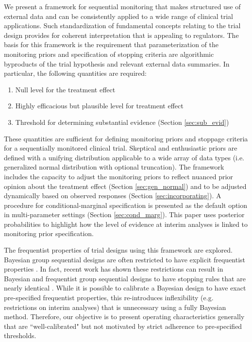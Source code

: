 \documentclass[useAMS,usenatbib,referee]{biom}
\begin{document}
We present a framework for sequential monitoring that makes structured use of external data and can be consistently applied to a wide range of clinical trial applications. Such standardization of fundamental concepts relating to the trial design provides for coherent interpretation that is appealing to regulators. The basis for this framework is the requirement that parameterization of the monitoring priors and specification of stopping criteria are algorithmic byproducts of the trial hypothesis and relevant external data summaries. In particular, the following quantities are required:

\begin{enumerate}
\item Null level for the treatment effect
\item Highly efficacious but plausible level for treatment effect
\item Threshold for determining substantial evidence (Section \ref{sec:sub_evid})
\end{enumerate}

These quantities are sufficient for defining monitoring priors and stoppage criteria for a sequentially monitored clinical trial. Skeptical and enthusiastic priors are defined with a unifying distribution applicable to a wide array of data types (i.e. generalized normal distribution with optional truncation). The framework includes the capacity to adjust the monitoring priors to reflect nuanced prior opinion about the treatment effect (Section \ref{sec:gen_normal}) and to be adjusted dynamically based on observed responses (Section \ref{sec:incorporating}). A procedure for conditional-marginal specification is presented as the default option in multi-parameter settings (Section \ref{sec:cond_marg}). This paper uses posterior probabilities to highlight how the level of evidence at interim analyses is linked to monitoring prior specification. 

The frequentist properties of trial designs using this framework are explored. Bayesian group sequential designs are often restricted to have explicit frequentist properties \citep{Ventz2015, Zhu2015}. In fact, recent work has shown these restrictions can result in Bayesian and frequentist group sequential designs to have stopping rules that are nearly identical \citep{Stallard2020, Kopp-Schneider2019, Zhu2019}.
While it is possible to calibrate a Bayesian design to have exact pre-specified frequentist properties, this re-introduces inflexibility (e.g. restrictions on interim analyses) that is unnecessary using a fully Bayesian method. Therefore, our objective is to present operating characteristics generally that are ``well-calibrated" \citep{Grieve2016} but not motivated by strict adherence to pre-specified thresholds. 
\end{document}

